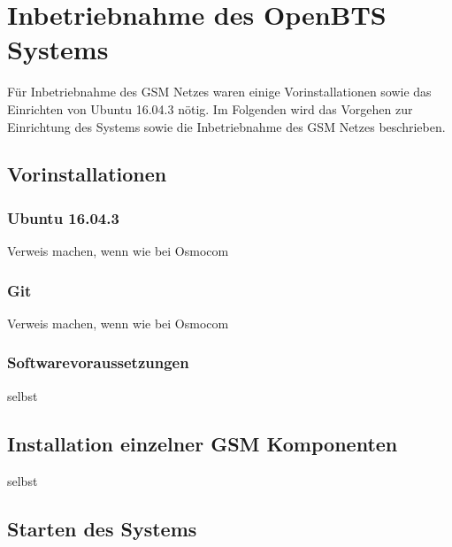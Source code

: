 
\section{Inbetriebnahme des OpenBTS Systems}
Für Inbetriebnahme des GSM Netzes waren einige Vorinstallationen sowie das Einrichten von Ubuntu 16.04.3 nötig. Im Folgenden wird das Vorgehen zur Einrichtung des Systems sowie die Inbetriebnahme des GSM Netzes beschrieben.

\subsection{Vorinstallationen}

\subsubsection{Ubuntu 16.04.3}

Verweis machen, wenn wie bei Osmocom

\subsubsection{Git}

Verweis machen, wenn wie bei Osmocom

\subsubsection{Softwarevoraussetzungen}

selbst

\subsection{Installation einzelner GSM Komponenten}\label{GSM_Komp}

selbst 

\subsection{Starten des Systems}
